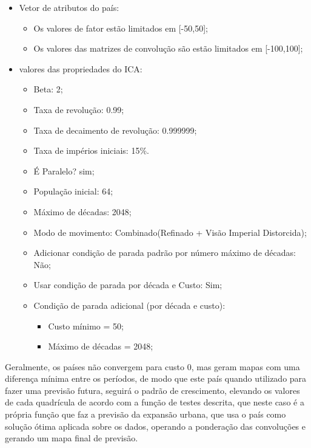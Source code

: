 \begin{itemize}
	\item Vetor de atributos do país:
	
	\begin{itemize}
		\item Os valores de fator estão limitados em [-50,50];
		\item Os valores das matrizes de convolução são estão limitados em [-100,100];
	\end{itemize}
	
	\item valores das propriedades do ICA:
	
	\begin{itemize}
		\item Beta: 2;
		\item Taxa de revolução: 0.99;
		\item Taxa de decaimento de revolução: 0.999999;
		\item Taxa de impérios iniciais: 15\%.
		\item É Paralelo? sim;
		\item População inicial: 64;
		\item Máximo de décadas: 2048;
		\item Modo de movimento: Combinado(Refinado + Visão Imperial Distorcida);
		\item Adicionar condição de parada 	padrão por número máximo de décadas: Não; 
		\item Usar condição de parada por década e Custo: Sim;
		\item Condição de parada adicional (por década e custo):

		\begin{itemize}
			\item Custo mínimo = 50;
			\item Máximo de décadas = 2048;
		\end{itemize}

	\end{itemize}
	
\end{itemize}


Geralmente, os países não convergem para custo 0, mas geram mapas com uma diferença mínima entre os períodos, de modo que este país quando utilizado para fazer uma previsão futura, seguirá o padrão de crescimento, elevando os valores de cada quadrícula de acordo com a função de testes descrita, que neste caso é a própria função que faz a previsão da expansão urbana, que usa o país como solução ótima aplicada sobre os dados, operando a ponderação das convoluções e gerando um mapa final de previsão.

